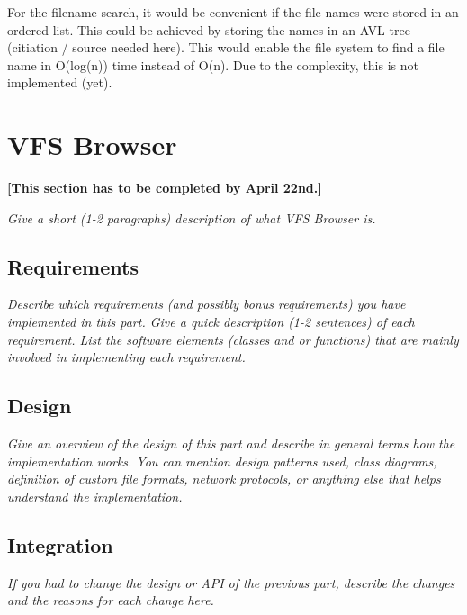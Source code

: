 \documentclass[a4paper,12pt]{article}
\begin{document}
For the filename search, it would be convenient if the file names were stored in an ordered list. This could be achieved by storing the names in an AVL tree (citiation / source needed here). This would enable the file system to
find a file name in O(log(n)) time instead of O(n). Due to the complexity, this is not implemented (yet).






\section{VFS Browser}

\textbf{[This section has to be completed by April 22nd.]}

\emph{Give a short (1-2 paragraphs) description of what VFS Browser is.}


\subsection{Requirements}

\emph{Describe which requirements (and possibly bonus requirements) you have implemented in this part. Give a quick description (1-2 sentences) of each requirement. List the software elements (classes and or functions) that are mainly involved in implementing each requirement.}


\subsection{Design}

\emph{Give an overview of the design of this part and describe in general terms how the implementation works. You can mention design patterns used, class diagrams, definition of custom file formats, network protocols, or anything else that helps understand the implementation.}


\subsection{Integration}

\emph{If you had to change the design or API of the previous part, describe the changes and the reasons for each change here.}
\end{document}
